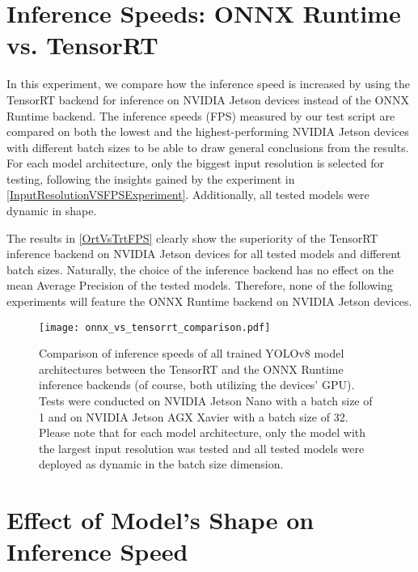 \section{Inference Speeds: ONNX Runtime vs. TensorRT}

In this experiment, we compare how the inference speed is increased by using the
TensorRT backend for inference on NVIDIA Jetson devices instead of the ONNX
Runtime backend. The inference speeds (FPS) measured by our test script are
compared on both the lowest and the highest-performing NVIDIA Jetson devices
with different batch sizes to be able to draw general conclusions from the
results. For each model architecture, only the biggest input resolution is
selected for testing, following the insights gained by the experiment in
\autoref{InputResolutionVSFPSExperiment}. Additionally, all tested models were
dynamic in shape.

The results in \autoref{OrtVsTrtFPS} clearly show the superiority of the
TensorRT inference backend on NVIDIA Jetson devices for all tested models and
different batch sizes. Naturally, the choice of the inference backend has no
effect on the mean Average Precision of the tested models. Therefore, none of
the following experiments will feature the ONNX Runtime backend on NVIDIA Jetson
devices.


\begin{figure}[t]
    \begin{framed}
        \centering
        \texttt{[image: onnx\_vs\_tensorrt\_comparison.pdf]}
        \caption{Comparison of inference speeds of all trained YOLOv8 model
        architectures between the TensorRT and the ONNX Runtime inference backends
        (of course, both utilizing the devices' GPU). Tests were conducted on NVIDIA
        Jetson Nano with a batch size of 1 and on NVIDIA Jetson AGX Xavier with a
        batch size of 32. Please note that for each model architecture, only the
        model with the largest input resolution was tested and all tested models were
        deployed as dynamic in the batch size dimension.}
        \label{OrtVsTrtFPS}
    \end{framed}
\end{figure}




\section{Effect of Model's Shape on Inference Speed}

